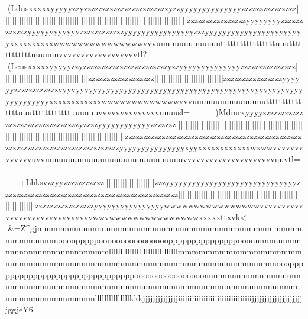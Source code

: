 {{{{{{{{{{{{{{{{{{{{{{{{{{{{{{{{{{{{{{{{{{{{{{{{{{{{{{{{{{{{{{{{{{{{{{{{{{{{{{{{{{{{{{{{{{{{{{{{{{{{{{{{{{{{{{{{{{{{{{{{{{{{{{{{{{{{{{(Ldnsxxxxxyyyyyzzyzzzzzzzzzzzzzzzzzzzzzzzyzzyyyyyyyyyyyyyyzzzzzzzzzzz{{{{{{{{{{{zzzz{{{{{{||||{|{{{{{{{{||||||||||||||||||||||||||||||||||{{||{{{{{{{{{{{{{{{{{{||||||||||{{{{{{{{{{{{{{{{{{{{{{{{{{{{{{{{{{{{{{{{{{{{{{||||||||||||||||||||{{{{{{||||{{{{||||||{{{{{{{{{{zzzzzzzzzzzzzzzzyyyyyyyyzzzzzzzzzzzzyyyyyyyyyyyyzzzzzzzzzzzzyyyyyyyyyyyyyyyyzzzyyyyyyyyyyyyyyyyyyyyyyyxxxxxxxxxxwwwwwwwwwwwwwwwvvvuuuuuuuuuuuuuutttttttttttttttttuuuttttttttttttuuuuuuvvvvvvvvvvvvvvvvvvtl?	(Lcnsxxxxxyyyyyzzyzzzzzzzzzzzzzzzzzzzzzzzyzzyyyyyyyyyyyyyyzzzzzzzzzzz{{{{{{{{{{{zzzz{{{{{{||||{|{{{{{{{{||||||||||||||||||||||||||||||||||{{{{zzzzzzzzzzzzzzzzzz{{{{{{{{{{{{{{{{{{{{{{{{{{{{{{{{{{{{{{{{{{{{{{{{{{{{{{{{||||||||||||||||||||{{{{{{||||{{{{||||||{{{{{{{{{{{{zzzzzzzzzzzzzzzzyyyyyyzzzzzzzzzzzzyyyyyyyyyyyyyyyyyyyyyyyyyyyyyyyyyyyyyyyyyyyyyyyyyyyyyyyyyyyyyyyyyyxxxxxxxxxxxxwwwwwwwwwwwwwvvvuuuuuuuuuuuuuuuutttttttttttttttuuuttttttttttttuuuuuuvvvvvvvvvvvvvvuuuusl=)Mdmrxyyyyzzzzzzzzzzzzzzzzzzzzzzzzzzzzzzzyzzzzyyyyyyyyyyyyzzzzzzz{{{{||||{||{{{{{{{{{{{{||||||||||||||||||}}}}}}}}}}}}}}}}}}}}}}}}}}}}}}}|||{{{{{{{{{{{{{{{{{{{{{{{{{{{{{{||||||||||||||||||||||||||||||||||||||||||||||||}}}}}}}}}}}}}}}|}}|||||||||||||||||||||||||||||{||{{{{{{{{{{{{{z{{zzzzzzzzzzzzzzzzzzzzzzzzzzzzzzzzzzzzzzzzzzzzzzzzzzzzzzzzzzzzzzzzzzzzzzzzzzzzzzyyyyyyyyyyyyyyyxyyxxxxxxxxxxxxwxwwvvvvvvvvvvvvvuvvuuuuuuuuuuuuuuuuuuuuuuuuuuuuuuvvvvvvvvvvvvvvvvvvvvvuuvtl=	+Lhksv{{{{{{{{{{{{{{{{{{{{{{{{{{{{{{{{{{{{zzyyzzzzzzzzzz{{z{{{{{{||||}}}}}||||||||||||||}}|}}}}}}}}}}}}}}|||{{{{{{{{{{{{{{{{{{{{{{{{{{{{{zzzyyyyyyyyyyyyyyyyyyyyyyyyyyyyyyzzzzzzzzzzzzzzzzzzzzzzzzzzzzzzzzzzzzzzzzzzzzzzzz{{{{{{{{{{{{{{|||}}}}}}}}}}}}}}}}}}}}}}}}}}}}}}}||||||||||||||||{{{{{{{{{{{{{{{{{{{{{{{{{{{{{{{{||||||||||||||||||||||||||||||||||||||||||||||||zzzzzzzzzzzzzzzzyyyyyyyyyyyyyyyywwwwwwwwwwwwwwwwvvvvvvvvvvvvvvvvvvvvvvvvvvvvvvwwvwwwwwwwwwwwwwwwxxxxxttxvk<		
&=Z^gjmmmmnnnnnnnnnnnnnnnnnnnnnnnnnnnnnnnnmmmmmmmmmmmmmmmmnnnnnnnoooopppppoooooooooooooooopppppppppppppppooonnnnnnnnnnnnnnnnnnnnnnnnnnnnnmmmllllllllllllllllllllllllllllllmmmmmmmmmmmmmmmmmmmmmmmmmmmmmmmmmmmmmmmmmmmmmmmmnnnnnnnnnnnnnnooopppppppppppppppppppppppppppppppoooooooooooooooonnnnnnnnnnnnnnnnnnnnnnnnnnnnnnnnnnnnnnnnnnnnnnnnnnnnnnnnnnnnnnnnnnnnnnnnnnnnnnnnmmmmmmmmmmmmmmmmlllllllllllllllkkkjjjjjjjjjjjjjjiiiiiiiiiiiiiiiiiiiiiiiiiiiiiiiijjjjjjjjjjjjjjjjjjjjjggjeY6
	
}}}}}}}}}}}}}}}}}}}}}}}}}}}}}}}}}}}}}}}}}}}}}}}}}}}}}}}}}}}}}}}}}}}}}}}}}}}}}}}}}}}}}}}}}}}}}}}}}}}}}}}}}}}}}}}}}}}}}}}}}}}}}}}}}}}}}}}}}}}}}}}}}}}}}}}}}}}}}}}}}}}}}}}}}}}}}}}}}}}}}}}}}}}}}}}}}}}}}}}}}}}}}}}}}}}}}}}}}}}}}}}}}}}}}}}}}}}}}}}}}}}}}}}}}}}}}}}}}}}}}}}}}}}}}}}}}}}}}}}}}}}}}}}}}}}}}}}}}}}}}}}}}}}}}}}}}}}}}}}}}}}}}}}}}}}}}}}}}}}}}}}}}}}}}}}}}}}}}}}}}}}}}}}}}}}}}}}}}}}}}}}}}}}}}}}}}}}}}}}}}}}}}}}}}}}}}}}}}}}}}}}}}}}}}}}}}}}}
